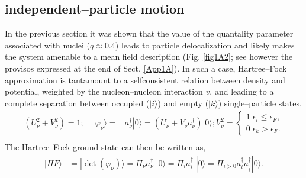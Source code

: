  \subsection{independent--particle motion}\label{C1S1D1}
In the previous section it was shown that the value of the quantality parameter associated with nuclei ($q\approx 0.4$) leads to particle delocalization and likely makes the system amenable to a mean field description (Fig. \ref{fig1A2}; see however the provisos expressed at the end of Sect. \ref{App1A}). In such a case, Hartree--Fock approximation is tantamount to a selfconsistent relation between density and potential, weighted by the nucleon--nucleon interaction $v$, and
  leading to a  complete separation between occupied ($|i\rangle$) and empty ($|k\rangle$) single--particle states,
 \begin{equation}
\begin{split}
\left(U^2_\nu+V_\nu^2\right)=1;\quad |\varphi_\nu\rangle=&\bar a_\nu^{\dagger}|0\rangle=\left(U_\nu+V_\nu a_\nu^{\dagger}\right)|0\rangle; V^2_\nu=\left\{\begin{array}{c}
1\;\epsilon_i\leq \epsilon_F, \\ 
0\; \epsilon_k>\epsilon_F.
\end{array}\right.\\ 
\end{split}
\end{equation}
The Hartree--Fock ground state can then be written as, 
 \begin{equation}
\begin{split}
|HF\rangle&=|\det(\varphi_\nu)\rangle=\Pi_\nu \bar a_\nu^{\dagger}\; |0\rangle=\Pi_i a_i^{\dagger}\; |0\rangle=\Pi_{i>0} a_i^{\dagger}a_{\tilde i}^{\dagger}|0\rangle.\\
\end{split}
\end{equation}
